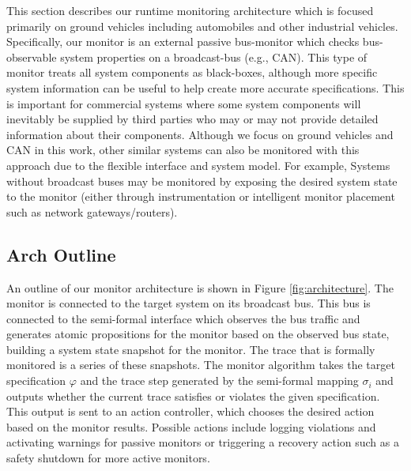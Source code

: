 \documentclass[]{llncs}
\newcommand{\agmon}{\ensuremath{\mathbf{agmon}}}
\begin{document}
This section describes our runtime monitoring architecture which is focused primarily on ground vehicles including automobiles and other industrial vehicles. Specifically, our monitor is an external passive bus-monitor which checks bus-observable system properties on a broadcast-bus (e.g., CAN). 
This type of monitor treats all system components as black-boxes, although more specific system information can be useful to help create more accurate specifications. This is important for commercial systems where some system components will inevitably be supplied by third parties who may or may not provide detailed information about their components. 
Although we focus on ground vehicles and CAN in this work, other similar systems can also be monitored with this approach due to the flexible interface and system model.
For example, Systems without broadcast buses may be monitored by exposing the desired system state to the monitor (either through instrumentation or intelligent monitor placement such as network gateways/routers).

\subsection{Arch Outline}
An outline of our monitor architecture is shown in Figure \ref{fig:architecture}. The monitor is connected to the target system on its broadcast bus. This bus is connected to the semi-formal interface which observes the bus traffic and generates atomic propositions for the monitor based on the observed bus state, building a system state snapshot for the monitor. 
The trace that is formally monitored is a series of these snapshots. The monitor algorithm takes the target specification $\varphi$ and the trace step generated by the semi-formal mapping $\sigma_i$ and outputs whether the current trace satisfies or violates the given specification. 
This output is sent to an action controller, which chooses the desired action based on the monitor results. Possible actions include logging violations and activating warnings for passive monitors or triggering a recovery action such as a safety shutdown for more active monitors.

\end{document}
